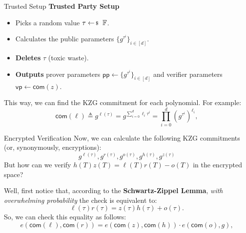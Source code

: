 \documentclass{zkdl-presentation-template}
\begin{document}
    \begin{frame}{Trusted Setup}
        \textbf{Trusted Party Setup}
        \vspace{-5pt}
        \begin{itemize}[label=]
            \item \vspace{-3pt} Picks a random value $\tau \leftarrowS \mathbb{F}$. \pause
            \item \vspace{-3pt} Calculates the public parameters $\{g^{\tau^i}\}_{i \in [d]}$.\pause
            \item \vspace{-3pt} \textbf{Deletes} $\tau$ (toxic waste).\pause
            \item \vspace{-3pt} \textbf{Outputs} prover parameters $\mathsf{pp} \gets \{g^{\tau^i}\}_{i \in [d]}$ and verifier parameters $\mathsf{vp} \gets \mathsf{com}(z)$.
        \end{itemize} \pause

        This way, we can find the KZG commitment for each polynomial. For example:
        \begin{equation*}
            \mathsf{com}(\ell) \triangleq g^{\ell(\tau)} = g^{\sum_{i=0}^d \ell_i \tau^i} = \prod_{i=0}^d (g^{\tau^i})^{\ell_i},
        \end{equation*}
    \end{frame}

    \begin{frame}{Encrypted Verification}
        Now, we can calculate the following KZG commitments (or, synonymously, encryptions):
        \begin{equation*}
            g^{\ell(\tau)}, g^{r(\tau)}, g^{o(\tau)}, g^{h(\tau)}, g^{z(\tau)}
        \end{equation*}
        But how can we verify $h(T)z(T) = \ell(T)r(T) - o(T)$ in the encrypted space?
        \pause

        Well, first notice that, according to the \textbf{Schwartz-Zippel Lemma}, \textit{with overwhelming probability} the check is equivalent to:
        \begin{equation*}
            \ell(\tau)r(\tau) = z(\tau)h(\tau) + o(\tau).
        \end{equation*}
        \pause
        So, we can check this equality as follows:
        \begin{equation*}
            e(\mathsf{com}(\ell), \mathsf{com}(r)) = e(\mathsf{com}(z), \mathsf{com}(h)) \cdot e(\mathsf{com}(o), g),
        \end{equation*}
    \end{frame}
\end{document}
